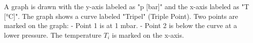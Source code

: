 A graph is drawn with the y-axis labeled as "p [bar]" and the x-axis labeled as "T [°C]". The graph shows a curve labeled "Tripel" (Triple Point). Two points are marked on the graph:  
- Point 1 is at 1 mbar.  
- Point 2 is below the curve at a lower pressure.  
The temperature \( T_i \) is marked on the x-axis.